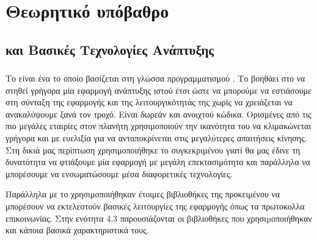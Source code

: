 \chapter{Θεωρητικό υπόβαθρο}

\section{ και Βασικές Τεχνολογίες Ανάπτυξης}

\subsection{}

Το  είναι ένα  το οποίο βασίζεται στη γλώσσα προγραμματισμού . 
Το  βοηθάει στο να στηθεί γρήγορα μία εφαρμογή ανάπτυξης ιστού έτσι ώστε να μπορούμε να εστιάσουμε στη σύνταξη της εφαρμογής και της λειτουργικότητάς της χωρίς να χρειάζεται να ανακαλύψουμε ξανά τον τροχό.
Είναι δωρεάν και ανοιχτού κώδικα. Ορισμένες από τις πιο μεγάλες εταιρίες στον πλανήτη χρησιμοποιούν την ικανότητα του
να κλιμακώνεται γρήγορα και με ευελιξία για να ανταποκρίνεται στις μεγαλύτερες απαιτήσεις κίνησης. Στη δικιά μας περίπτωση χρησιμοποιήθηκε το συγκεκριμένου
 γιατί θα μας έδινε τη δυνατότητα να φτιάξουμε μία εφαρμογή με μεγάλη επεκτασιμότητα και παράλληλα να μπορέσουμε να ενσωματώσουμε μέσα διαφορετικές τεχνολογίες.

Παράλληλα με το  χρησιμοποιήθηκαν έτοιμες βιβλιοθήκες της  προκειμένου να μπορέσουν να εκτελεστούν βασικές λειτουργίες της εφαρμογής όπως 
τα πρωτοκολλα επικοινωνίας. Στην ενότητα 4.3 παρουσιάζονται οι βιβλιοθήκες που χρησιµοποιήθηκαν και κάποια βασικά χαρακτηριστικά τους.

